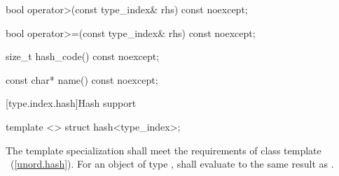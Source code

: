 \begin{itemdescr}
\pnum
\returns {}
\end{itemdescr}

%
%
\begin{itemdecl}
bool operator>(const type_index& rhs) const noexcept;
\end{itemdecl}

\begin{itemdescr}
\pnum
\returns {}
\end{itemdescr}

%
%
\begin{itemdecl}
bool operator>=(const type_index& rhs) const noexcept;
\end{itemdecl}

\begin{itemdescr}
\pnum
\returns {}
\end{itemdescr}

%
%
\begin{itemdecl}
size_t hash_code() const noexcept;
\end{itemdecl}

\begin{itemdescr}
\pnum
\returns {}
\end{itemdescr}

%
%
\begin{itemdecl}
const char* name() const noexcept;
\end{itemdecl}

\begin{itemdescr}
\pnum
\returns {}
\end{itemdescr}

[type.index.hash]{Hash support}

%
\begin{itemdecl}
template <> struct hash<type_index>;
\end{itemdecl}

\begin{itemdescr}
\pnum
The template specialization shall meet the requirements of class template
~(\ref{unord.hash}). For an object  of type ,
 shall evaluate to the same result as .
\end{itemdescr}

